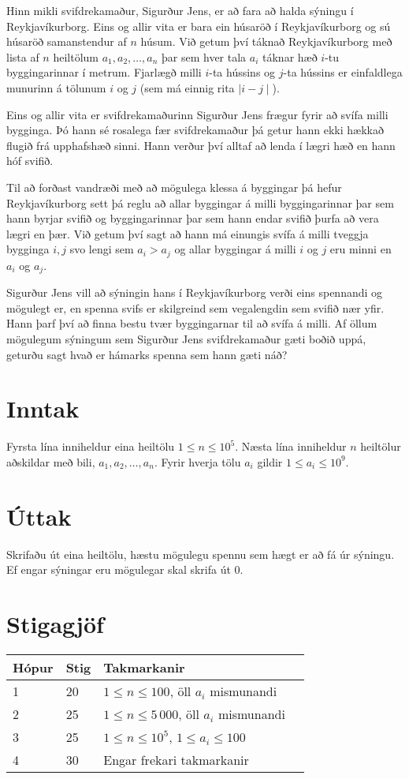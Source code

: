 
\noindent
Hinn mikli svifdrekamaður, Sigurður Jens, er að fara að halda sýningu í Reykjavíkurborg.
Eins og allir vita er bara ein húsaröð í Reykjavíkurborg og sú húsaröð samanstendur af $n$ húsum.
Við getum því táknað Reykjavíkurborg með lista af $n$ heiltölum $a_1, a_2, \dotsc, a_n$ þar sem hver tala $a_i$ táknar hæð $i$-tu byggingarinnar í metrum.
Fjarlægð milli $i$-ta hússins og $j$-ta hússins er einfaldlega munurinn á tölunum $i$ og $j$ (sem má einnig rita $\mid i - j \mid$).

Eins og allir vita er svifdrekamaðurinn Sigurður Jens frægur fyrir að svífa milli bygginga.
Þó hann sé rosalega fær svifdrekamaður þá getur hann ekki hækkað flugið frá upphafshæð sinni.
Hann verður því alltaf að lenda í lægri hæð en hann hóf svifið.

Til að forðast vandræði með að mögulega klessa á byggingar þá hefur Reykjavíkurborg sett þá reglu að allar byggingar á milli
byggingarinnar þar sem hann byrjar svifið og byggingarinnar þar sem hann endar svifið þurfa að vera lægri en þær.
Við getum því sagt að hann má einungis svífa á milli tveggja bygginga $i,j$ svo lengi sem $a_i > a_j$ og allar byggingar á milli $i$ og $j$ eru minni en $a_i$ og $a_j$.

Sigurður Jens vill að sýningin hans í Reykjavíkurborg verði eins spennandi og mögulegt er, en spenna svifs er skilgreind sem vegalengdin sem svifið nær yfir.
Hann þarf því að finna bestu tvær byggingarnar til að svífa á milli.
Af öllum mögulegum sýningum sem Sigurður Jens svifdrekamaður gæti boðið uppá, geturðu sagt hvað er hámarks spenna sem hann gæti náð?


\section*{Inntak}
Fyrsta lína inniheldur eina heiltölu $1 \le n \le 10^5$.
Næsta lína inniheldur $n$ heiltölur aðskildar með bili, $a_1, a_2, \dotsc, a_n$. Fyrir hverja tölu $a_i$ gildir $1 \le a_i \le 10^9$.

\section*{Úttak}
Skrifaðu út eina heiltölu, hæstu mögulegu spennu sem hægt er að fá úr sýningu. Ef engar sýningar eru mögulegar skal skrifa út $0$.

\section*{Stigagjöf}
\begin{tabular}{|l|l|l|l|}
\hline
Hópur & Stig & Takmarkanir \\ \hline
1     & 20    & $1 \le n \le 100$, öll $a_i$ mismunandi \\ \hline
2     & 25    & $1 \le n \le 5\,000$, öll $a_i$ mismunandi \\ \hline
3     & 25    & $1 \le n \le 10^5$, $1 \le a_i \le 100$ \\ \hline
4     & 30    & Engar frekari takmarkanir \\ \hline
\end{tabular}
